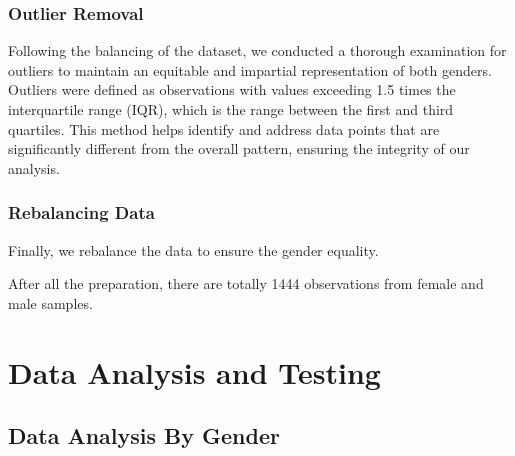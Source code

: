\documentclass{article}
\begin{document}
	\subsubsection{Outlier Removal}
	
	Following the balancing of the dataset, we conducted a thorough examination for outliers to maintain an equitable and impartial representation of both genders. Outliers were defined as observations with values exceeding 1.5 times the interquartile range (IQR), which is the range between the first and third quartiles. This method helps identify and address data points that are significantly different from the overall pattern, ensuring the integrity of our analysis.
	
	\subsubsection{Rebalancing Data}
	
	Finally, we rebalance the data to ensure the gender equality.
	
	After all the preparation, there are totally 1444 observations from female and male samples.
	
	\section{Data Analysis and Testing}
	
	\subsection{Data Analysis By Gender}
	
\end{document}
